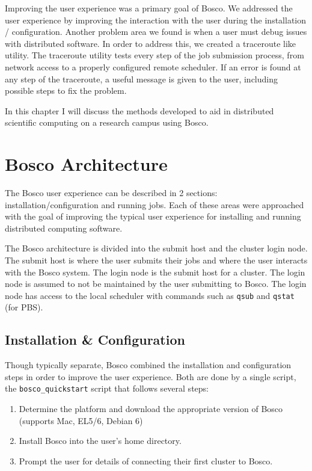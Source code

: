 Improving the user experience was a primary goal of Bosco.  We addressed the user experience by improving the interaction with the user during the installation / configuration.  Another problem area we found is when a user must debug issues with distributed software.  In order to address this, we created a traceroute \cite{mao2003towards} like utility.  The traceroute utility tests every step of the job submission process, from network access to a properly configured remote scheduler.  If an error is found at any step of the traceroute, a useful message is given to the user, including possible steps to fix the problem.




In this chapter I will discuss the methods developed to aid in distributed scientific computing on a research campus using Bosco.  

\section{Bosco Architecture}
\label{sec:boscoarch}

% 

The Bosco user experience can be described in 2 sections: installation/configuration and running jobs.  Each of these areas were approached with the goal of improving the typical user experience for installing and running distributed computing software.

The Bosco architecture is divided into the submit host and the cluster login node.  The submit host is where the user submits their jobs and where the user interacts with the Bosco system.  The login node is the submit host for a cluster.  The login node is assumed to not be maintained by the user submitting to Bosco.  The login node has access to the local scheduler with commands such as \texttt{qsub} and \texttt{qstat} (for PBS).  

\subsection{Installation \& Configuration}
Though typically separate, Bosco combined the installation and configuration steps in order to improve the user experience.  Both are done by a single script, the \texttt{bosco\_quickstart} script that follows several steps:

\begin{enumerate}
\item Determine the platform and download the appropriate version of Bosco (supports Mac, EL5/6, Debian 6)
\item Install Bosco into the user's home directory.
\item Prompt the user for details of connecting their first cluster to Bosco.
\end{enumerate}

